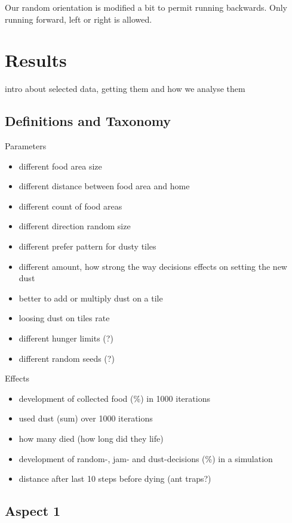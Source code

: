 Our random orientation is modified a bit to permit running backwards.
Only running forward, left or right is allowed.

\section{Results}\label{results}

intro about selected data, getting them and how we analyse them

\subsection{Definitions and Taxonomy}\label{definitions-and-taxonomy}

Parameters

\begin{itemize}
\tightlist
\item
  different food area size
\item
  different distance between food area and home
\item
  different count of food areas
\item
  different direction random size
\item
  different prefer pattern for dusty tiles
\item
  different amount, how strong the way decisions effects on setting the
  new dust
\item
  better to add or multiply dust on a tile
\item
  loosing dust on tiles rate
\item
  different hunger limits (?)
\item
  different random seeds (?)
\end{itemize}

Effects

\begin{itemize}
\tightlist
\item
  development of collected food (\%) in 1000 iterations
\item
  used dust (sum) over 1000 iterations
\item
  how many died (how long did they life)
\item
  development of random-, jam- and dust-decisions (\%) in a simulation
\item
  distance after last 10 steps before dying (ant traps?)
\end{itemize}

\subsection{Aspect 1}\label{aspect-1}


